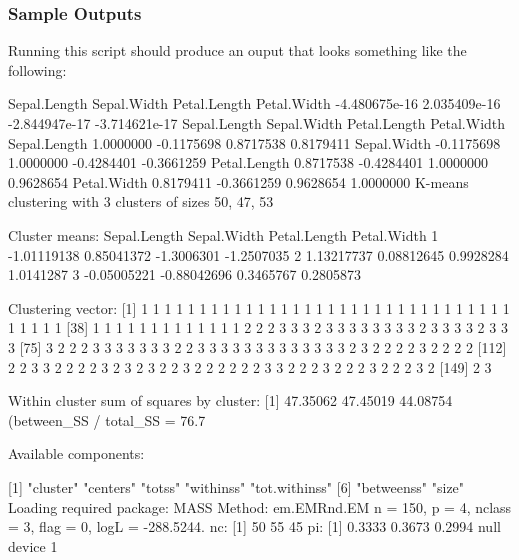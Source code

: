 \subsubsection{Sample Outputs}
Running this script should produce an ouput that looks something like the following:
\begin{Output}
 Sepal.Length   Sepal.Width  Petal.Length   Petal.Width 
-4.480675e-16  2.035409e-16 -2.844947e-17 -3.714621e-17 
             Sepal.Length Sepal.Width Petal.Length Petal.Width
Sepal.Length    1.0000000  -0.1175698    0.8717538   0.8179411
Sepal.Width    -0.1175698   1.0000000   -0.4284401  -0.3661259
Petal.Length    0.8717538  -0.4284401    1.0000000   0.9628654
Petal.Width     0.8179411  -0.3661259    0.9628654   1.0000000
K-means clustering with 3 clusters of sizes 50, 47, 53

Cluster means:
  Sepal.Length Sepal.Width Petal.Length Petal.Width
1  -1.01119138  0.85041372   -1.3006301  -1.2507035
2   1.13217737  0.08812645    0.9928284   1.0141287
3  -0.05005221 -0.88042696    0.3465767   0.2805873

Clustering vector:
  [1] 1 1 1 1 1 1 1 1 1 1 1 1 1 1 1 1 1 1 1 1 1 1 1 1 1 1 1 1 1 1 1 1 1 1 1 1 1
 [38] 1 1 1 1 1 1 1 1 1 1 1 1 1 2 2 2 3 3 3 2 3 3 3 3 3 3 3 3 2 3 3 3 3 2 3 3 3
 [75] 3 2 2 2 3 3 3 3 3 3 3 2 2 3 3 3 3 3 3 3 3 3 3 3 3 3 2 3 2 2 2 2 3 2 2 2 2
[112] 2 2 3 3 2 2 2 2 3 2 3 2 3 2 2 3 2 2 2 2 2 2 3 3 2 2 2 3 2 2 2 3 2 2 2 3 2
[149] 2 3

Within cluster sum of squares by cluster:
[1] 47.35062 47.45019 44.08754
 (between_SS / total_SS =  76.7 %

Available components:

[1] "cluster"      "centers"      "totss"        "withinss"     "tot.withinss"
[6] "betweenss"    "size"        
Loading required package: MASS
Method: em.EMRnd.EM
 n = 150, p = 4, nclass = 3, flag = 0, logL = -288.5244.
nc: 
[1] 50 55 45
pi: 
[1] 0.3333 0.3673 0.2994
null device 
          1 
\end{Output}

